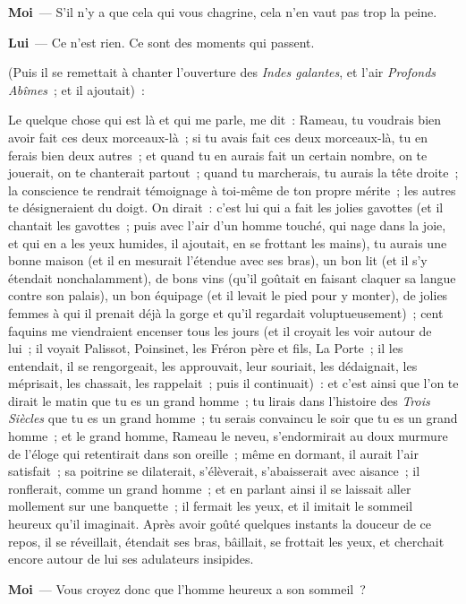 \documentclass[french,twoside]{book} %
\newcommand{\labelchar}[1]{\textbf{\color{rubric} #1}}
\begin{document}
\labelchar{Moi} — S’il n’y a que cela qui vous chagrine, cela n’en vaut pas trop la peine.\par
\labelchar{Lui} — Ce n’est rien. Ce sont des moments qui passent.\par
(Puis il se remettait à chanter l’ouverture des \emph{Indes galantes}, et l’air \emph{Profonds Abîmes} ; et il ajoutait) :\par
Le quelque chose qui est là et qui me parle, me dit : Rameau, tu voudrais bien avoir fait ces deux morceaux-là ; si tu avais fait ces deux morceaux-là, tu en ferais bien deux autres ; et quand tu en aurais fait un certain nombre, on te jouerait, on te chanterait partout ; quand tu marcherais, tu aurais la tête droite ; la conscience te rendrait témoignage à toi-même de ton propre mérite ; les autres te désigneraient du doigt. On dirait : c’est lui qui a fait les jolies gavottes (et il chantait les gavottes ; puis avec l’air d’un homme touché, qui nage dans la joie, et qui en a les yeux humides, il ajoutait, en se frottant les mains), tu aurais une bonne maison (et il en mesurait l’étendue avec ses bras), un bon lit (et il s’y étendait nonchalamment), de bons vins (qu’il goûtait en faisant claquer sa langue contre son palais), un bon équipage (et il levait le pied pour y monter), de jolies femmes à qui il prenait déjà la gorge et qu’il regardait voluptueusement) ; cent faquins me viendraient encenser tous les jours (et il croyait les voir autour de lui ; il voyait Palissot, Poinsinet, les Fréron père et fils, La Porte ; il les entendait, il se rengorgeait, les approuvait, leur souriait, les dédaignait, les méprisait, les chassait, les rappelait ; puis il continuait) : et c’est ainsi que l’on te dirait le matin que tu es un grand homme ; tu lirais dans l’histoire des \emph{Trois Siècles} que tu es un grand homme ; tu serais convaincu le soir que tu es un grand homme ; et le grand homme, Rameau le neveu, s’endormirait au doux murmure de l’éloge qui retentirait dans son oreille ; même en dormant, il aurait l’air satisfait ; sa poitrine se dilaterait, s’élèverait, s’abaisserait avec aisance ; il ronflerait, comme un grand homme ; et en parlant ainsi il se laissait aller mollement sur une banquette ; il fermait les yeux, et il imitait le sommeil heureux qu’il imaginait. Après avoir goûté quelques instants la douceur de ce repos, il se réveillait, étendait ses bras, bâillait, se frottait les yeux, et cherchait encore autour de lui ses adulateurs insipides.\par
\labelchar{Moi} — Vous croyez donc que l’homme heureux a son sommeil ?\par
\end{document}
